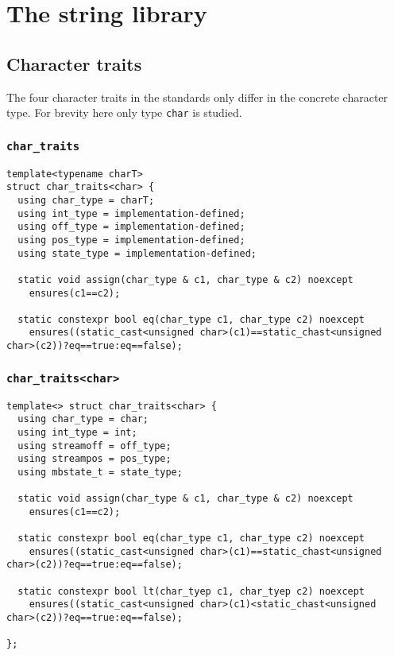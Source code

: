 \section{The string library}

\subsection{Character traits}

The four character traits in the standards only differ in the concrete character type.
For brevity here only type \texttt{char} is studied.

\subsubsection{\texttt{char\_traits}}

\begin{lstlisting}
template<typename charT> 
struct char_traits<char> {
  using char_type = charT;
  using int_type = implementation-defined;
  using off_type = implementation-defined;
  using pos_type = implementation-defined;
  using state_type = implementation-defined;

  static void assign(char_type & c1, char_type & c2) noexcept
    ensures(c1==c2);

  static constexpr bool eq(char_type c1, char_type c2) noexcept
    ensures((static_cast<unsigned char>(c1)==static_chast<unsigned char>(c2))?eq==true:eq==false);
\end{lstlisting}



\subsubsection{\texttt{char\_traits<char>}}

\begin{lstlisting}
template<> struct char_traits<char> {
  using char_type = char;
  using int_type = int;
  using streamoff = off_type;
  using streampos = pos_type;
  using mbstate_t = state_type;

  static void assign(char_type & c1, char_type & c2) noexcept
    ensures(c1==c2);

  static constexpr bool eq(char_type c1, char_type c2) noexcept
    ensures((static_cast<unsigned char>(c1)==static_chast<unsigned char>(c2))?eq==true:eq==false);

  static constexpr bool lt(char_tyep c1, char_tyep c2) noexcept
    ensures((static_cast<unsigned char>(c1)<static_chast<unsigned char>(c2))?eq==true:eq==false);
  
};
\end{lstlisting}
